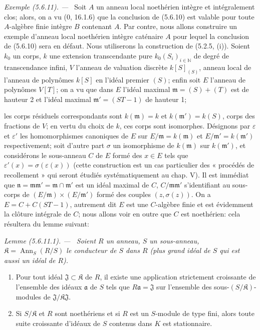 \documentclass[10pt,oneside]{book}
\makeatletter
\newcommand{\oldpage}[2][]{%
  \setcounter{footnote}{0}%
  \marginpar{\scriptsize\textbf{#1}~|~#2}\ignorespaces}
\newenvironment{example}[1][]{%
  \par\medskip\noindent\textit{Exemple (#1). ---\ }}{\par}
\newenvironment{lemma}[1][]{%
  \par\medskip\noindent\itshape Lemme (#1). ---\ }{\par}
\newcommand{\EGAReaderTarget}[2]{\hypertarget{#1}{}\@bsphack\begingroup\def\@currentHref{#1}\label{#2}\endgroup\@esphack}
\makeatother
\begin{document}
\begin{example}[5.6.11]
\label{IV.2.s5.6.11-fr}
Soit $A$ un anneau local noethérien intègre et intégralement clos; alors, on
a vu (0, 16.1.6) que la conclusion de (5.6.10) est valable pour toute
$A$-algèbre finie intègre $B$ contenant $A$. Par contre, nous allons
construire un exemple d'anneau local noethérien intègre caténaire $A$ pour
lequel la conclusion de (5.6.10) sera en défaut. Nous utiliserons la
construction de (5.2.5, (i)). Soient $k_0$ un corps, $k$ une extension
transcendante pure $k_0(S_i)_{i\in\mathbb N}$ de degré de transcendance
infini, $V$ l'anneau de valuation discrète $k[S]_{(S)}$, anneau local de
l'anneau de polynômes $k[S]$ en l'idéal premier $(S)$; enfin soit $E$
l'anneau de polynômes $V[T]$; on a vu que dans $E$ l'idéal maximal
$\mathfrak m=(S)+(T)$ est de hauteur 2 et l'idéal maximal
$\mathfrak m'=(ST-1)$ de hauteur 1;

\oldpage[IV-2]{102}

les corps résiduels correspondants sont $k(\mathfrak m)=k$ et
$k(\mathfrak m')=k(S)$, corps des fractions de $V$; en vertu du choix de
$k$, ces corps sont isomorphes. Désignons par $\varepsilon$ et
$\varepsilon'$ les homomorphismes canoniques de $E$ sur
$E/\mathfrak m=k(\mathfrak m)$ et $E/\mathfrak m'=k(\mathfrak m')$
respectivement; soit d'autre part $\sigma$ un isomorphisme de
$k(\mathfrak m)$ sur $k(\mathfrak m')$, et considérons le sous-anneau $C$
de $E$ formé des $x\in E$ tels que
$\varepsilon'(x)=\sigma(\varepsilon(x))$ (cette construction est un cas
particulier des « procédés de recollement » qui seront étudiés
systématiquement au chap. V). Il est immédiat que
$\mathfrak n=\mathfrak m\mathfrak m'=\mathfrak m\cap\mathfrak m'$ est un
idéal maximal de $C$, $C/\mathfrak m\mathfrak m'$ s'identifiant au
sous-corps de $(E/\mathfrak m)\times(E/\mathfrak m')$ formé des couples
$(z,\sigma(z))$. On a $E=C+C(ST-1)$, autrement dit $E$ est une
$C$-algèbre finie et est évidemment la clôture intégrale de $C$; nous allons
voir en outre que $C$ est noethérien: cela résultera du lemme suivant:

\begin{lemma}[5.6.11.1]
\EGAReaderTarget{ega4.c04.lem.5-6-11-1}{IV.2.s5.6.11.1-fr}
Soient $R$ un anneau, $S$ un sous-anneau,
$\mathfrak K=\operatorname{Ann}_S(R/S)$ le conducteur de $S$ dans $R$
(plus grand idéal de $S$ qui est aussi un idéal de $R$).
\begin{enumerate}
\item[(i)] Pour tout idéal $\mathfrak J\subset\mathfrak K$ de $R$, il existe
une application strictement croissante de l'ensemble des idéaux
$\mathfrak a$ de $S$ tels que $R\mathfrak a=\mathfrak J$ sur l'ensemble des
sous-$(S/\mathfrak K)$-modules de
$\mathfrak J/\mathfrak K\mathfrak J$.
\item[(ii)] Si $S/\mathfrak K$ et $R$ sont noethériens et si $R$ est un
$S$-module de type fini, alors toute suite croissante d'idéaux de $S$
contenus dans $K$ est stationnaire.
\end{enumerate}
\end{lemma}


\end{example}
\end{document}
